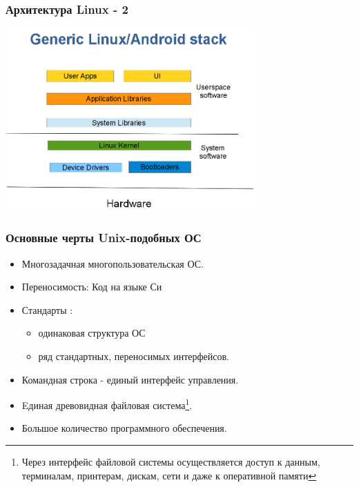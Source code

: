 \begin{frame}
  \frametitle{Архитектура Linux - 2}

  \begin{center}
    \includegraphics[height=7cm]{linux-software-stack}
  \end{center}
\end{frame}

\begin{frame}
  \frametitle{Основные черты Unix-подобных ОС}

  \begin{itemize}
    \item Многозадачная многопользовательская ОС.
    \item Переносимость: Код на языке Си
    \item Стандарты :
      \begin{itemize} 
	\item одинаковая структура ОС
	\item ряд стандартных, переносимых интерфейсов.
      \end{itemize}
    \item Командная строка - единый интерфейс управления.
    \item Eдиная древовидная файловая система\footnote{Через интерфейс файловой системы осуществляется доступ к данным, терминалам, принтерам, дискам, сети и даже к оперативной памяти}.
    \item Большое количество программного обеспечения.
  \end{itemize}
\end{frame}




